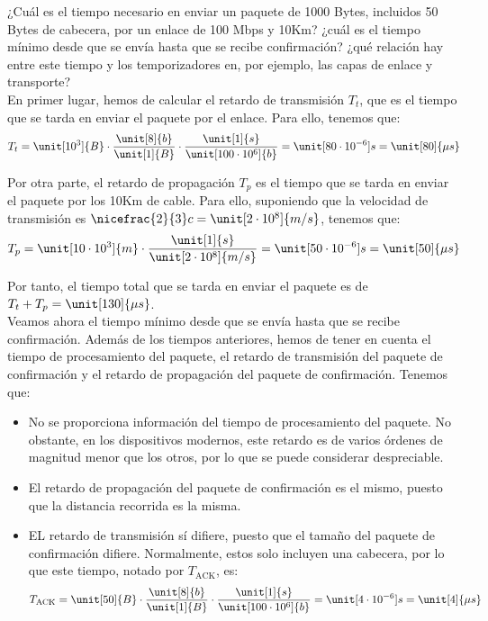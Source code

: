 \begin{ejercicio}
    ¿Cuál es el tiempo necesario en enviar un paquete de 1000 Bytes, incluidos 50 Bytes de cabecera, por un enlace de 100 Mbps y 10Km? ¿cuál es el tiempo mínimo desde que se envía hasta que se recibe confirmación? ¿qué relación hay entre este tiempo y los temporizadores en, por ejemplo, las capas de enlace y transporte?\\

    En primer lugar, hemos de calcular el retardo de transmisión $T_t$, que es el tiempo que se tarda en enviar el paquete por el enlace. Para ello, tenemos que:
    \begin{equation*}
        T_t = \unit[10^3]{B} \cdot \dfrac{\unit[8]{b}}{\unit[1]{B}} \cdot \dfrac{\unit[1]{s}}{\unit[100 \cdot 10^6]{b}} = \unit[80\cdot 10^{-6}]{s} = \unit[80]{\mu s}
    \end{equation*}

    Por otra parte, el retardo de propagación $T_p$ es el tiempo que se tarda en enviar el paquete por los 10Km de cable. Para ello, suponiendo que la velocidad de transmisión es $\nicefrac{2}{3}c = \unit[2\cdot 10^8]{m/s}$, tenemos que:
    \begin{equation*}
        T_p = \unit[10\cdot 10^3]{m} \cdot \dfrac{\unit[1]{s}}{\unit[2\cdot 10^8]{m/s}} = \unit[50\cdot 10^{-6}]{s} =\unit[50]{\mu s}
    \end{equation*}

    Por tanto, el tiempo total que se tarda en enviar el paquete es de $T_t + T_p = \unit[130]{\mu s}$.\\

    Veamos ahora el tiempo mínimo desde que se envía hasta que se recibe confirmación. Además de los tiempos anteriores, hemos de tener en cuenta el tiempo de procesamiento del paquete, el retardo de transmisión del paquete de confirmación y el retardo de propagación del paquete de confirmación. Tenemos que:
    \begin{itemize}
        \item No se proporciona información del tiempo de procesamiento del paquete. No obstante, en los dispositivos modernos, este retardo es de varios órdenes de magnitud menor que los otros, por lo que se puede considerar despreciable.
        \item El retardo de propagación del paquete de confirmación es el mismo, puesto que la distancia recorrida es la misma.
        \item EL retardo de transmisión sí difiere, puesto que el tamaño del paquete de confirmación difiere. Normalmente, estos solo incluyen una cabecera, por lo que este tiempo, notado por $T_{\text{ACK}}$, es:
        \begin{equation*}
            T_{\text{ACK}} = \unit[50]{B} \cdot \dfrac{\unit[8]{b}}{\unit[1]{B}} \cdot \dfrac{\unit[1]{s}}{\unit[100 \cdot 10^6]{b}} = \unit[4\cdot 10^{-6}]{s} = \unit[4]{\mu s}
        \end{equation*}


\end{itemize}
\end{ejercicio}
